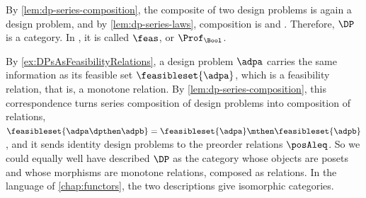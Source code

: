 By \cref{lem:dp-series-composition}, the composite of two design problems is again a design problem, and by \cref{lem:dp-series-laws}, composition is  and .
Therefore, $\DP$ is a category.
In \cite{fong2019}, it is called $\feas$, or $\Prof_{\Bool}$.

\begin{remark}
    By \cref{ex:DPsAsFeasibilityRelations}, a design problem $\adpa$ carries the same information as its feasible set $\feasibleset{\adpa}$, which is a feasibility relation, that is, a monotone relation.
    By \cref{lem:dp-series-composition}, this correspondence turns series composition of design problems into composition of relations, $\feasibleset{\adpa \dpthen \adpb} = \feasibleset{\adpa} \mthen \feasibleset{\adpb}$, and it sends identity design problems to the preorder relations $\posAleq$.
    So we could equally well have described $\DP$ as the category whose objects are posets and whose morphisms are monotone relations, composed as relations.
    In the language of \cref{chap:functors}, the two descriptions give isomorphic categories.
\end{remark}


